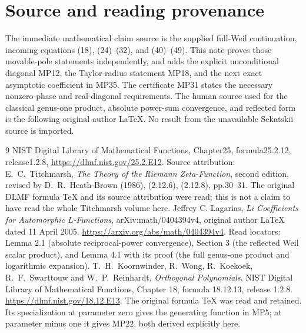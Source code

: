 \documentclass[11pt]{article}
\begin{document}
\section*{Source and reading provenance}
The immediate mathematical claim source is the supplied full-Weil
continuation, incoming equations (18), (24)--(32), and (40)--(49).
This note proves those movable-pole statements independently, and adds
the explicit unconditional diagonal MP12, the Taylor-radius statement
MP18, and the next exact asymptotic coefficient in MP35. The certificate
MP31 states the necessary nonzero-phase and real-diagonal requirements.
The human source used for the classical genus-one product, absolute
power-sum convergence, and reflected form is the following original
author LaTeX. No result from the unavailable Sekatskii source is imported.

\begin{thebibliography}{9}
NIST Digital Library of Mathematical Functions, Chapter25,
formula25.2.12, release1.2.8,
\url{https://dlmf.nist.gov/25.2.E12}.
Source attribution: E.~C.~Titchmarsh,
\emph{The Theory of the Riemann Zeta-Function}, second edition,
revised by D.~R.~Heath-Brown (1986), (2.12.6), (2.12.8), pp.30--31.
The original DLMF formula TeX and its source attribution were read;
this is not a claim to have read the whole Titchmarsh volume here.
Jeffrey C. Lagarias,
\emph{Li Coefficients for Automorphic $L$-Functions},
arXiv:math/0404394v4, original author LaTeX dated 11 April 2005.
\url{https://arxiv.org/abs/math/0404394v4}.
Read locators: Lemma 2.1 (absolute reciprocal-power convergence),
Section 3 (the reflected Weil scalar product), and Lemma 4.1 with its
proof (the full genus-one product and logarithmic expansion).
T.~H.~Koornwinder, R.~Wong, R.~Koekoek, R.~F.~Swarttouw and
W.~P.~Reinhardt, \emph{Orthogonal Polynomials}, NIST Digital
Library of Mathematical Functions, Chapter 18, formula 18.12.13,
release 1.2.8. \url{https://dlmf.nist.gov/18.12.E13}.
The original formula TeX was read and retained. Its specialization
at parameter zero gives the generating function in MP5; at
parameter minus one it gives MP22, both derived explicitly here.
\end{thebibliography}
\end{document}
